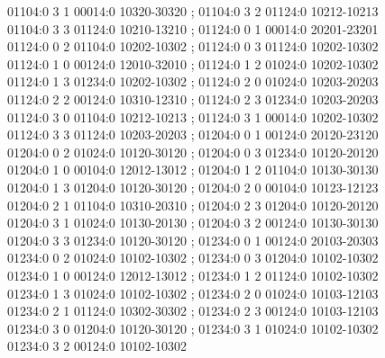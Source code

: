 \documentclass[11pt]{article}
\theoremstyle{remark}
\numberwithin{equation}{section}
\numberwithin{table}{section}
\begin{document}
\begin{flushleft}
01104:0 3 1 00014:0 10320-30320 ; 01104:0 3 2 01124:0 10212-10213\\
01104:0 3 3 01124:0 10210-13210 ; 01124:0 0 1 00014:0 20201-23201\\
01124:0 0 2 01104:0 10202-10302 ; 01124:0 0 3 01124:0 10202-10302\\
01124:0 1 0 00124:0 12010-32010 ; 01124:0 1 2 01024:0 10202-10302\\
01124:0 1 3 01234:0 10202-10302 ; 01124:0 2 0 01024:0 10203-20203\\
01124:0 2 2 00124:0 10310-12310 ; 01124:0 2 3 01234:0 10203-20203\\
01124:0 3 0 01104:0 10212-10213 ; 01124:0 3 1 00014:0 10202-10302\\
01124:0 3 3 01124:0 10203-20203 ; 01204:0 0 1 00124:0 20120-23120\\
01204:0 0 2 01024:0 10120-30120 ; 01204:0 0 3 01234:0 10120-20120\\
01204:0 1 0 00104:0 12012-13012 ; 01204:0 1 2 01104:0 10130-30130\\
01204:0 1 3 01204:0 10120-30120 ; 01204:0 2 0 00104:0 10123-12123\\
01204:0 2 1 01104:0 10310-20310 ; 01204:0 2 3 01204:0 10120-20120\\
01204:0 3 1 01024:0 10130-20130 ; 01204:0 3 2 00124:0 10130-30130\\
01204:0 3 3 01234:0 10120-30120 ; 01234:0 0 1 00124:0 20103-20303\\
01234:0 0 2 01024:0 10102-10302 ; 01234:0 0 3 01204:0 10102-10302\\
01234:0 1 0 00124:0 12012-13012 ; 01234:0 1 2 01124:0 10102-10302\\
01234:0 1 3 01024:0 10102-10302 ; 01234:0 2 0 01024:0 10103-12103\\
01234:0 2 1 01124:0 10302-30302 ; 01234:0 2 3 00124:0 10103-12103\\
01234:0 3 0 01204:0 10120-30120 ; 01234:0 3 1 01024:0 10102-10302\\
01234:0 3 2 00124:0 10102-10302\\
\end{flushleft}\endgroup
\end{document}
